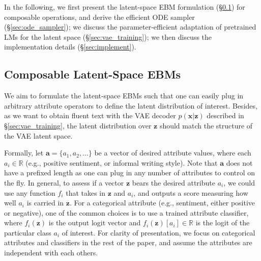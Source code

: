 \documentclass[11pt]{article}
\begin{document}
In the following, we first present the latent-space EBM formulation (\S\ref{sec:latent_ebms}) for composable operations, and derive the efficient ODE sampler (\S\ref{sec:ode_sampler}); we discuss the parameter-efficient adaptation of pretrained LMs for the latent space (\S\ref{sec:vae_training});  we then discuss the implementation details (\S\ref{sec:implement}).






\subsection{Composable Latent-Space EBMs}
\label{sec:latent_ebms}

We aim to formulate the latent-space EBMs such that one can easily plug in arbitrary attribute operators to define the latent distribution of interest. Besides, as we want to obtain fluent text with the VAE decoder $p(\bm{x}|\bm{z})$ described in \S\ref{sec:vae_training}, the latent distribution over $\bm{z}$ should match the structure of the VAE latent space. 

Formally, let $\bm a=\{a_1, a_2, ...\}$ be a vector of desired attribute values, where each $a_i \in \mathbb{R}$ (e.g., positive sentiment, or informal writing style). Note that $\bm{a}$ does not have a prefixed length as one can plug in any number of attributes to control on the fly. In general, to assess if a vector $\bm{z}$ bears the desired attribute $a_i$, we could use any function $f_i$ that takes in $\bm{z}$ and $a_i$, and outputs a score measuring how well $a_i$ is carried in $\bm{z}$. 
For a categorical attribute (e.g., sentiment, either positive or negative), one of the common choices is to use a trained attribute classifier, where $f_i(\bm{z})$ is the output logit vector and $f_i(\bm{z})[a_i] \in \mathbb{R}$ is the logit of the particular class $a_i$ of interest. For clarity of presentation, we focus on categorical attributes and classifiers in the rest of the paper, and assume the attributes are independent with each others. 
\end{document}

